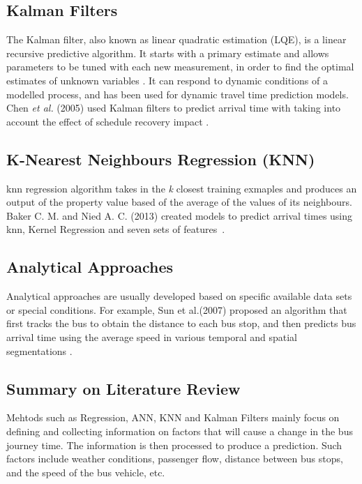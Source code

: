\subsection{Kalman Filters}
\par The Kalman filter, also known as linear quadratic estimation (LQE), is a linear recursive predictive algorithm. It starts with a primary estimate and allows parameters to be tuned with each new measurement, in order to find the optimal estimates of unknown variables \cite{kalman_filters}. It can respond to dynamic conditions of a modelled process, and has been used for dynamic travel time prediction models. Chen \textit{et al.} (2005) used Kalman filters to predict arrival time with taking into account the effect of schedule recovery impact \cite{kalman_dynamic_schedule}.

\subsection{K-Nearest Neighbours Regression (KNN)}
\par \acrfull{knn} regression algorithm takes in the \textit{k} closest training exmaples and produces an output of the property value based of the average of the values of its neighbours. Baker C. M. and Nied A. C. (2013) created models to predict arrival times using \acrshort{knn}, Kernel Regression and seven sets of features~\cite{knn_one_bus_away}.

\subsection{Analytical Approaches}
\par Analytical approaches are usually developed based on specific available data sets or special conditions. For example, Sun et al.(2007) proposed an algorithm that first tracks the bus to obtain the distance to each bus stop, and then predicts bus arrival time using the average speed in various temporal and spatial segmentations \cite{analytical_approach}.

\subsection{Summary on Literature Review}
\par Mehtods such as Regression, ANN, KNN and Kalman Filters mainly focus on defining and collecting information on factors that will cause a change in the bus journey time. The information is then processed to produce a prediction. Such factors include weather conditions, passenger flow, distance between bus stops, and the speed of the bus vehicle, etc.

